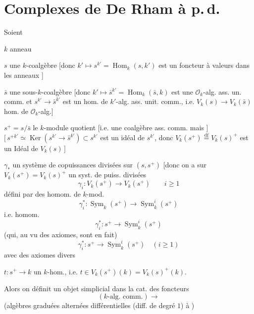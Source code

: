 \documentclass[11pt,a4paper]{article}
\begin{document}
\section{Complexes  de De Rham à p.\,d.}


Soient

$k$ anneau  

\struck{\ill{}} $s$ une $k$-coalgèbre \add{$[s\to s\otimes_k s]$}
 [donc  $k'\mapsto s^{k'}=\operatorname{Hom}_k(s,k')$
est un foncteur à valeurs dans les anneaux  ]

\struck{\ill{}}

$\bar s$ une sous-$k$-coalgèbre  [donc
 $k'\mapsto \bar s^{k'}=\operatorname{Hom}_k(\bar s,k)$ est une
$\mathcal{O}_k$-alg. ass. un. comm. et $s^{k'}\to\bar s^{k'}$ est un hom.
de $k'$-alg. ass. unit. comm., i.e. $V_k(s)\to V_k(\bar s)$ hom. de
$\mathcal{O}_k$-alg.]

$s^+=s/\bar s$ le $k$-module quotient [i.e. une coalgèbre ass. comm. mais
\ill{}] \quad $[\,s^{+k'}\simeq\operatorname{Ker}(s^{k'}\to\bar s^{k'})\subset s^{k'}$ est un
idéal de $s^{k'}$, donc $V_k(s^+)\overset{\mathrm{df}}{=}V_k(s)^+$ est un Idéal de
$V_k(s)\,]$

$\gamma_*$ un système de copuissances divisées sur $(s,s^+)$
[donc on a sur $V_k(s^+)=V_k(s)^+$ un syst. de puiss. divisées
\[
  \gamma_i : V_k(s^+)\longrightarrow V_k(s^+) \qquad i\geqslant 1
\]
défini par des homom. de $k$-mod.
\[
  \gamma_i^{*} : \operatorname{Sym}_k(s^+)\longrightarrow \operatorname{Sym}^i_k(s^+)
\]
\struck{\ill{}} i.e. homom. 
\[
  \gamma_i^{*} : s^+\longrightarrow \operatorname{Sym}^i_k(s^+)
\]
(qui, au vu des axiomes, sont en fait)
\[
  \boxed{\gamma_i^{*} : s^+\longrightarrow \operatorname{Sym}^i_k(s^+)\quad (i\geqslant 1)}
\]
avec des axiomes divers

$t : s^+\to k$ un $k$-hom., i.e.
$t\in V_k(s^+)(k)=V_k(s)^+(k)$.

Alors on définit un objet simplicial dans la cat. des foncteurs
\[
  (k\text{-alg. comm.})\longrightarrow
\]
(algèbres graduées alternées différentielles (diff. de degré $1$) à
 )
\end{document}
